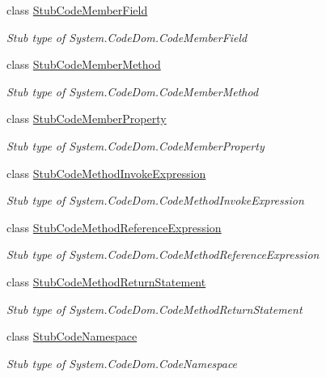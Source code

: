 \begin{DoxyCompactItemize}
class \hyperlink{class_system_1_1_code_dom_1_1_fakes_1_1_stub_code_member_field}{Stub\-Code\-Member\-Field}
\begin{DoxyCompactList}\small\item\em Stub type of System.\-Code\-Dom.\-Code\-Member\-Field\end{DoxyCompactList}\item 
class \hyperlink{class_system_1_1_code_dom_1_1_fakes_1_1_stub_code_member_method}{Stub\-Code\-Member\-Method}
\begin{DoxyCompactList}\small\item\em Stub type of System.\-Code\-Dom.\-Code\-Member\-Method\end{DoxyCompactList}\item 
class \hyperlink{class_system_1_1_code_dom_1_1_fakes_1_1_stub_code_member_property}{Stub\-Code\-Member\-Property}
\begin{DoxyCompactList}\small\item\em Stub type of System.\-Code\-Dom.\-Code\-Member\-Property\end{DoxyCompactList}\item 
class \hyperlink{class_system_1_1_code_dom_1_1_fakes_1_1_stub_code_method_invoke_expression}{Stub\-Code\-Method\-Invoke\-Expression}
\begin{DoxyCompactList}\small\item\em Stub type of System.\-Code\-Dom.\-Code\-Method\-Invoke\-Expression\end{DoxyCompactList}\item 
class \hyperlink{class_system_1_1_code_dom_1_1_fakes_1_1_stub_code_method_reference_expression}{Stub\-Code\-Method\-Reference\-Expression}
\begin{DoxyCompactList}\small\item\em Stub type of System.\-Code\-Dom.\-Code\-Method\-Reference\-Expression\end{DoxyCompactList}\item 
class \hyperlink{class_system_1_1_code_dom_1_1_fakes_1_1_stub_code_method_return_statement}{Stub\-Code\-Method\-Return\-Statement}
\begin{DoxyCompactList}\small\item\em Stub type of System.\-Code\-Dom.\-Code\-Method\-Return\-Statement\end{DoxyCompactList}\item 
class \hyperlink{class_system_1_1_code_dom_1_1_fakes_1_1_stub_code_namespace}{Stub\-Code\-Namespace}
\begin{DoxyCompactList}\small\item\em Stub type of System.\-Code\-Dom.\-Code\-Namespace\end{DoxyCompactList}\item 

\end{DoxyCompactItemize}
